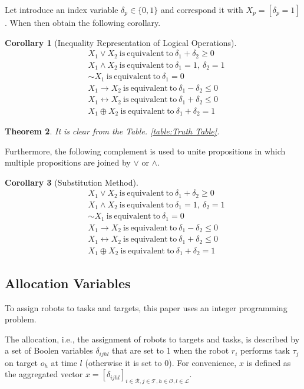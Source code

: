 \documentclass[]{interact}
\theoremstyle{plain}%
\newtheorem{theorem}{Theorem}[section]
\newtheorem{corollary}[theorem]{Corollary}
\theoremstyle{definition}
\theoremstyle{remark}
\begin{document}
Let introduce an index variable $\delta_p\in\{0,1\}$ and correspond it with $X_p=[\delta_p=1]$.
When then obtain the following corollary.
\begin{corollary}[Inequality Representation of Logical Operations]
    \begin{align}
        &X_1\vee X_2~\mathrm{is~equivalent~to}~\delta_1 + \delta_2 \ge 0\\
        &X_1\wedge X_2~\mathrm{is~equivalent~to}~\delta_1=1,~\delta_2=1\\
        &\sim X_1~\mathrm{is~equivalent~to}~\delta_1 = 0\\
        &X_1\rightarrow X_2~\mathrm{is~equivalent~to}~\delta_1 - \delta_2 \le 0\\
        &X_1\leftrightarrow X_2~\mathrm{is~equivalent~to}~\delta_1 + \delta_2 \le 0\\
        &X_1\oplus X_2~\mathrm{is~equivalent~to}~\delta_1 + \delta_2 = 1
    \end{align}
\end{corollary}
\begin{theorem}
    It is clear from the Table. \ref{table:Truth Table}.
\end{theorem}
Furthermore, the following complement is used to unite propositions in which multiple propositions are joined by $\vee$ or $\wedge$.
\begin{corollary}[Substitution Method]
    \begin{align}
        &X_1\vee X_2~\mathrm{is~equivalent~to}~\delta_1 + \delta_2 \ge 0\\
        &X_1\wedge X_2~\mathrm{is~equivalent~to}~\delta_1=1,~\delta_2=1\\
        &\sim X_1~\mathrm{is~equivalent~to}~\delta_1 = 0\\
        &X_1\rightarrow X_2~\mathrm{is~equivalent~to}~\delta_1 - \delta_2 \le 0\\
        &X_1\leftrightarrow X_2~\mathrm{is~equivalent~to}~\delta_1 + \delta_2 \le 0\\
        &X_1\oplus X_2~\mathrm{is~equivalent~to}~\delta_1 + \delta_2 = 1
    \end{align}
\end{corollary}
    
\subsection{Allocation Variables}
To assign robots to tasks and targets, this paper uses an integer programming problem.

The allocation, i.e., the assignment of robots to targets and tasks, is described by a set of Boolen variables $\delta_{ijhl}$ that are set to 1 when the robot $r_i$ performs task $\tau_j$ on target $o_h$ at time $l$ (otherwise it is set to 0).
For convenience, $x$ is defined as the aggregated vector $x=[\delta_{ijhl}]_{i\in\mathcal{R},j\in\mathcal{T},h\in\mathcal{O},l\in\mathcal{L}}$.
\end{document}
